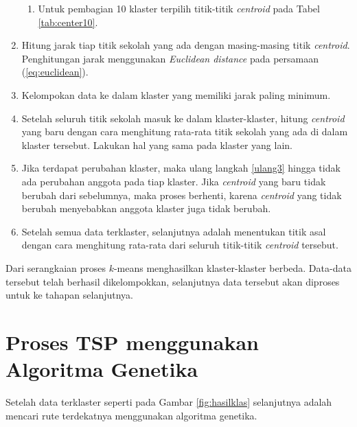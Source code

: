 \begin{enumerate}
\begin{enumerate}


	\item Untuk pembagian 10 klaster terpilih titik-titik \textit{centroid} pada Tabel \ref{tab:center10}.
	

		
	\end{enumerate}

	\item \label{ulang3} Hitung jarak tiap titik sekolah yang ada dengan masing-masing titik \textit{centroid}. Penghitungan jarak menggunakan \textit{Euclidean distance} pada persamaan (\ref{eq:euclidean}).
	
	\item Kelompokan data ke dalam klaster yang memiliki jarak paling minimum.
	\item Setelah seluruh titik sekolah masuk ke dalam klaster-klaster, hitung \textit{centroid} yang baru dengan cara menghitung rata-rata titik sekolah yang ada di dalam klaster tersebut. Lakukan hal yang sama pada klaster yang lain.
	\item Jika terdapat perubahan klaster, maka ulang langkah \ref{ulang3} hingga tidak ada perubahan anggota pada tiap klaster. Jika \textit{centroid} yang baru tidak berubah dari sebelumnya, maka proses berhenti, karena \textit{centroid} yang tidak berubah menyebabkan anggota klaster juga tidak berubah.
	
	\item Setelah semua data terklaster, selanjutnya adalah menentukan titik asal dengan cara menghitung rata-rata dari seluruh titik-titik \textit{centroid} tersebut.
\end{enumerate}

Dari serangkaian proses $k$-means menghasilkan klaster-klaster berbeda. Data-data tersebut telah berhasil dikelompokkan, selanjutnya data tersebut akan diproses untuk ke tahapan selanjutnya.

\section{Proses TSP menggunakan Algoritma Genetika}

Setelah data terklaster seperti pada Gambar \ref{fig:hasilklas} selanjutnya adalah mencari rute terdekatnya menggunakan algoritma genetika.

